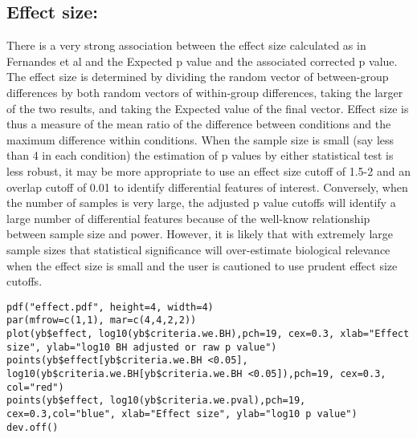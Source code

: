 \documentclass[11pt]{amsart}
\begin{document}
\subsection*{Effect size:} There is a very strong association between the effect size calculated as in Fernandes et al\cite{fernandes:2013} and the Expected p value and the associated corrected p value. The effect size is determined by dividing the random vector of between-group differences by both random vectors of within-group differences, taking the larger of the two results, and taking the Expected value of the final vector. Effect size is thus a measure of the mean ratio of the difference between conditions and the maximum difference within conditions. When the sample size is small (say less than 4 in each condition)  the estimation of p values by either statistical test is less robust, it may be more appropriate to use an effect size cutoff of 1.5-2 and an overlap cutoff of 0.01 to identify differential features of interest\cite{fernandes:2013}. Conversely, when the number of samples is very large, the adjusted p value cutoffs will identify a large number of differential features because of the well-know relationship between sample size and power. However, it is likely that with extremely large sample sizes that statistical significance will over-estimate biological relevance when the effect size is small and the user is cautioned to use prudent effect size cutoffs\cite{Nakagawa:2007}.


\begin{verbatim}pdf("effect.pdf", height=4, width=4)
par(mfrow=c(1,1), mar=c(4,4,2,2))
plot(yb$effect, log10(yb$criteria.we.BH),pch=19, cex=0.3, xlab="Effect size", ylab="log10 BH adjusted or raw p value")
points(yb$effect[yb$criteria.we.BH <0.05], log10(yb$criteria.we.BH[yb$criteria.we.BH <0.05]),pch=19, cex=0.3, col="red")
points(yb$effect, log10(yb$criteria.we.pval),pch=19, cex=0.3,col="blue", xlab="Effect size", ylab="log10 p value")
dev.off()
\end{verbatim}



\end{document}
